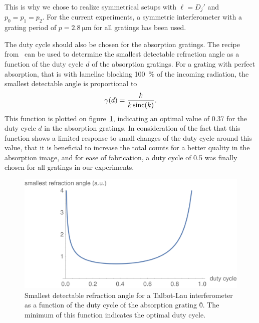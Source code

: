 This is why we chose to realize symmetrical setups with $\ell = D_j'$ and
$p_0 = p_1 = p_2$. For the current experiments, a symmetric interferometer
with a grating period of $p = \SI{2.8}{\micro\metre}$ for all gratings has
been used.

The duty cycle should also be chosen for the absorption gratings. The recipe
from~\cite{Thuering2014} can be used to determine the smallest detectable
refraction angle as a function of the duty cycle $d$ of the absorption
gratings. For a grating with perfect absorption, that is with lamellae
blocking \SI{100}{\percent} of the incoming radiation, the smallest
detectable angle is proportional to
\begin{equation}
    \gamma(d) = \frac{k}{k \operatorname{sinc}(k)}.
    \label{eq:sens-dc}
\end{equation}
This function is plotted on figure~\ref{fig:sens-dc}, indicating an optimal
value of 0.37 for the duty cycle $d$ in the absorption gratings. In
consideration of the fact that this function shows a limited response to
small changes of the duty cycle around this value, that it is beneficial
to increase the total counts for a better quality in the absorption image,
and for ease of fabrication, a duty cycle of 0.5 was finally chosen for all
gratings in our experiments.

\begin{figure}[htb]
    \centering
    \includegraphics[width=.6\textwidth]{gfx/sens-dc.png}
    \caption{Smallest detectable refraction angle for a Talbot-Lau
    interferometer as a function of the duty cycle of the absorption grating
\G0. The minimum of this function indicates the optimal duty cycle.}
    \label{fig:sens-dc}
\end{figure}

